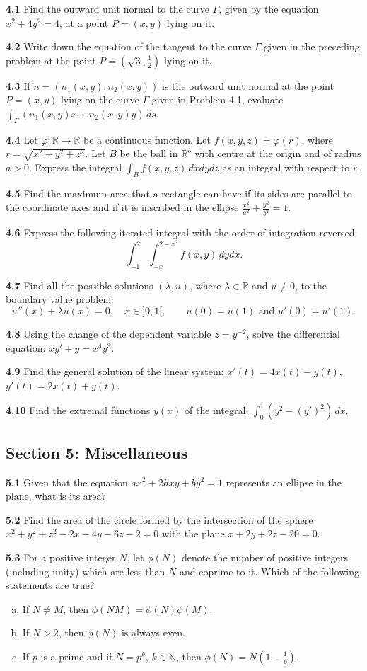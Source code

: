 \documentclass[11pt,a4paper]{article}
\newcommand{\N}{\mathbb{N}}
\newcommand{\R}{\mathbb{R}}
\newcommand{\examsec}[1]{%
  \subsection*{#1}
  \vspace{-2pt}
}
\newcommand{\qitem}[1]{\par\medskip\noindent\textbf{#1}\hspace{0.5em}}
\begin{document}
\qitem{4.1} Find the outward unit normal to the curve $\Gamma$, given by the equation $x^2 + 4y^2 = 4$, at a point $P = (x, y)$ lying on it.

\qitem{4.2} Write down the equation of the tangent to the curve $\Gamma$ given in the preceding problem at the point $P = (\sqrt{3}, \frac{1}{2})$ lying on it.

\qitem{4.3} If $n = (n_1(x, y), n_2(x, y))$ is the outward unit normal at the point $P = (x, y)$ lying on the curve $\Gamma$ given in Problem 4.1, evaluate $\int_{\Gamma} (n_1(x, y)x + n_2(x, y)y)\,ds$.

\qitem{4.4} Let $\varphi : \R \to \R$ be a continuous function. Let $f(x, y, z) = \varphi(r)$, where $r = \sqrt{x^2 + y^2 + z^2}$. Let $B$ be the ball in $\R^3$ with centre at the origin and of radius $a > 0$. Express the integral $\int_B f(x, y, z)\,dxdydz$ as an integral with respect to $r$.

\qitem{4.5} Find the maximum area that a rectangle can have if its sides are parallel to the coordinate axes and if it is inscribed in the ellipse $\frac{x^2}{a^2} + \frac{y^2}{b^2} = 1$.

\qitem{4.6} Express the following iterated integral with the order of integration reversed:
\[
  \int_{-1}^{2}\int_{-x}^{2-x^2} f(x, y)\,dydx.
\]

\qitem{4.7} Find all the possible solutions $(\lambda, u)$, where $\lambda \in \R$ and $u \not\equiv 0$, to the boundary value problem:
\[
  u''(x) + \lambda u(x) = 0,\quad x \in ]0, 1[,\qquad u(0) = u(1) \text{ and } u'(0) = u'(1).
\]

\qitem{4.8} Using the change of the dependent variable $z = y^{-2}$, solve the differential equation: $xy' + y = x^4 y^3$.

\qitem{4.9} Find the general solution of the linear system: $x'(t) = 4x(t) - y(t)$, $y'(t) = 2x(t) + y(t)$.

\qitem{4.10} Find the extremal functions $y(x)$ of the integral: $\int_0^1 (y^2 - (y')^2)\,dx$.

\examsec{Section 5: Miscellaneous}

\qitem{5.1} Given that the equation $ax^2 + 2hxy + by^2 = 1$ represents an ellipse in the plane, what is its area?

\qitem{5.2} Find the area of the circle formed by the intersection of the sphere $x^2 + y^2 + z^2 - 2x - 4y - 6z - 2 = 0$ with the plane $x + 2y + 2z - 20 = 0$.

\qitem{5.3} For a positive integer $N$, let $\phi(N)$ denote the number of positive integers (including unity) which are less than $N$ and coprime to it. Which of the following statements are true?
\begin{enumerate}[a.]
  \item If $N \neq M$, then $\phi(NM) = \phi(N)\phi(M)$.
  \item If $N > 2$, then $\phi(N)$ is always even.
  \item If $p$ is a prime and if $N = p^k$, $k \in \N$, then $\phi(N) = N\left(1 - \frac{1}{p}\right)$.
\end{enumerate}
\end{document}
